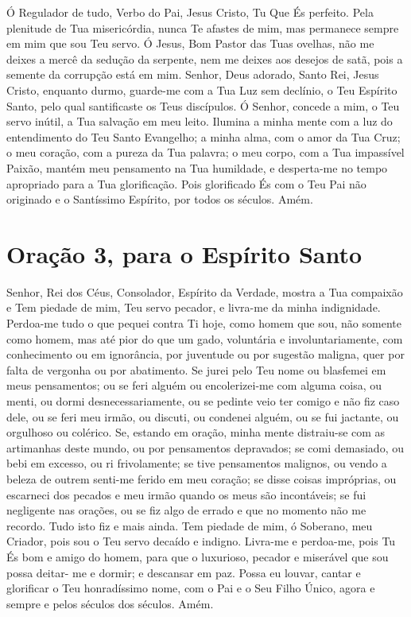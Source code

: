 \documentclass{subfiles}
\begin{document}

Ó Regulador de tudo, Verbo do Pai, Jesus Cristo, Tu Que És perfeito. 
Pela plenitude de Tua misericórdia, nunca Te afastes de mim, mas permanece 
sempre em mim que sou Teu servo. Ó Jesus, Bom Pastor das Tuas ovelhas, não 
me deixes a mercê da sedução da serpente, nem me deixes aos desejos de 
satã, pois a semente da corrupção está em mim. Senhor, Deus adorado, Santo 
Rei, Jesus Cristo, enquanto durmo, guarde-me com a Tua Luz sem declínio, o 
Teu Espírito Santo, pelo qual santificaste os Teus discípulos. Ó Senhor, concede 
a mim, o Teu servo inútil, a Tua salvação em meu leito. Ilumina a minha mente 
com a luz do entendimento do Teu Santo Evangelho; a minha alma, com o 
amor da Tua Cruz; o meu coração, com a pureza da Tua palavra; o meu corpo, 
com a Tua impassível Paixão, mantém meu pensamento na Tua humildade, e 
desperta-me no tempo apropriado para a Tua glorificação. Pois glorificado És 
com o Teu Pai não originado e o Santíssimo Espírito, por todos os séculos. Amém.

\section*{Oração 3, para o Espírito Santo} 

Senhor, Rei dos Céus, Consolador, Espírito da Verdade, mostra a Tua 
compaixão e Tem piedade de mim, Teu servo pecador, e livra-me da minha 
indignidade. Perdoa-me tudo o que pequei contra Ti hoje, como homem que 
sou, não somente como homem, mas até pior do que um gado, voluntária e 
involuntariamente, com conhecimento ou em ignorância, por juventude ou 
por sugestão maligna, quer por falta de vergonha ou por abatimento. Se jurei 
pelo Teu nome ou blasfemei em meus pensamentos; ou se feri alguém ou 
encolerizei-me com alguma coisa, ou menti, ou dormi desnecessariamente, ou 
se pedinte veio ter comigo e não fiz caso dele, ou se feri meu irmão, ou discuti, 
ou condenei alguém, ou se fui jactante, ou orgulhoso ou colérico. Se, estando 
em oração, minha mente distraiu-se com as artimanhas deste mundo, ou por 
pensamentos depravados; se comi demasiado, ou bebi em excesso, ou ri 
frivolamente; se tive pensamentos malignos, ou vendo a beleza de outrem 
senti-me ferido em meu coração; se disse coisas impróprias, ou escarneci dos 
pecados e meu irmão quando os meus são incontáveis; se fui negligente nas 
orações, ou se fiz algo de errado e que no momento não me recordo. Tudo isto 
fiz e mais ainda. Tem piedade de mim, ó Soberano, meu Criador, pois sou o 
Teu servo decaído e indigno. Livra-me e perdoa-me, pois Tu És bom e amigo 
do homem, para que o luxurioso, pecador e miserável que sou possa deitar-
me e dormir; e descansar em paz. Possa eu louvar, cantar e glorificar o Teu 
honradíssimo nome, com o Pai e o Seu Filho Único, agora e sempre e pelos 
séculos dos séculos. Amém.
\end{document}
